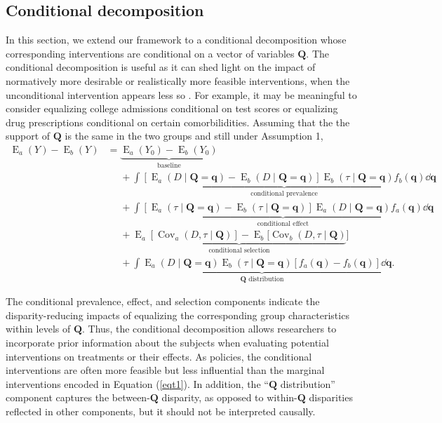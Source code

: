 \documentclass[12pt,a4paper]{article}
\newcommand{\Cov}{\operatorname{Cov}}
\newcommand{\E}{\operatorname{E}}
\def\Q{{\boldsymbol Q}}
\def\q{{\boldsymbol q}}
\begin{document}
\subsection{Conditional decomposition}
In this section, we extend our framework to a conditional decomposition whose corresponding interventions are conditional on a vector of variables $\boldsymbol{Q}$. The conditional decomposition is useful as it can shed light on the impact of normatively more desirable or realistically more feasible interventions, when the unconditional intervention appears less so \citep{jackson_meaningful_2021}. For example, it may be meaningful to consider equalizing college admissions conditional on test scores or equalizing drug prescriptions conditional on certain comorbilidities.
Assuming that the the support of $\Q$ is the same in the two groups and still under Assumption 1,
\begin{align}
    \E_a(Y)-\E_b(Y) &= \underbrace{\E_a(Y_0)-\E_b(Y_0)}_{\text{baseline}} \nonumber \\
    &\phantom{{}={}} + \underbrace{\int [\E_a(D \mid \Q=\q)-\E_b(D \mid \Q=\q)]\E_b(\tau \mid \Q=\q) f_b(\q) \dd \q}_{\text{conditional prevalence}} \nonumber \\
    &\phantom{{}={}} + \underbrace{\int [\E_a(\tau \mid \Q=\q)-\E_b(\tau \mid \Q=\q)] \E_a(D \mid \Q=\q) f_a(\q) \dd \q}_{\text{conditional effect}} \nonumber \\
    &\phantom{{}={}} + \underbrace{\E_a[\Cov_a(D, \tau \mid \Q)] - \E_b[\Cov_b(D, \tau \mid \Q)}_{\text{conditional selection}}] \nonumber \\
    &\phantom{{}={}} + \underbrace{\int \E_a(D \mid \Q=\q) \E_b(\tau \mid \Q=\q) [f_a(\q)-f_b(\q)] \dd \q}_{\text{$\Q$ distribution}}.
\end{align}

The conditional prevalence, effect, and selection components indicate the disparity-reducing impacts of equalizing the corresponding group characteristics within levels of $\Q$. Thus, the conditional decomposition allows researchers to incorporate prior information about the subjects when evaluating potential interventions on treatments or their effects. As policies, the conditional interventions are often more feasible but less influential than the marginal interventions encoded in Equation (\ref{eqt1}). In addition, the ``$\Q$ distribution'' component captures the between-$\Q$ disparity, as opposed to within-$\Q$ disparities reflected in other components, but it should not be interpreted causally.
\end{document}
